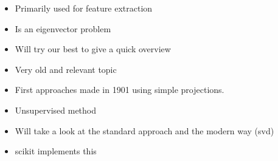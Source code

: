 \begin{itemize}
	\item Primarily used for feature extraction \cite{PythonMachineLearningCh5}
	\item Is an eigenvector problem \cite{MultilinearSubspaceLearningCh2}
	\item Will try our best to give a quick overview
	\item Very old and relevant topic
	\item First approaches made in 1901 using simple projections. \cite{pearson1901liii}
	\item Unsupervised method \cite{PythonMachineLearningCh5}
	\item Will take a look at the standard approach and the modern way (svd)
	\item scikit implements this \cite{tipping1999mixtures}
\end{itemize}









